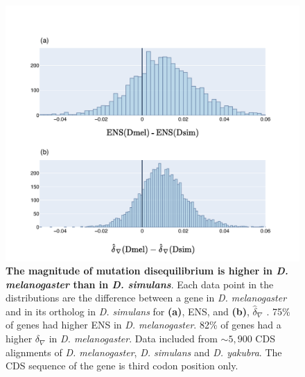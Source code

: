 \begin{figure}[ht!]
\centering
\includegraphics[width=	\textwidth]{figures/plots/drosophila/d-conv-diff.pdf}
\caption[The magnitude of mutation disequilibrium is higher in \textit{D. melanogaster} than in \textit{D. simulans}]{\textbf{The magnitude of mutation disequilibrium is higher in \textit{D. melanogaster} than in \textit{D. simulans}}. Each data point in the distributions are the difference between a gene in \textit{D. melanogaster} and in its ortholog in \textit{D. simulans} for \textbf{(a)}, ENS, and \textbf{(b)}, $\hat\delta_\nabla$ . 75\% of genes had higher ENS in \textit{D. melanogaster}. 82\% of genes had a higher $\delta_\nabla$ in \textit{D. melanogaster}. Data included from $\sim 5,900$ CDS alignments of \textit{D. melanogaster}, \textit{D. simulans} and \textit{D. yakubra}. The CDS sequence of the gene is third codon position only.}
\label{fig:drosophila_d-conv-diff}
\end{figure}
